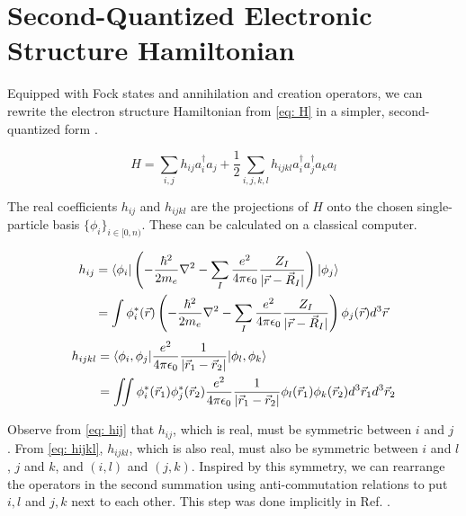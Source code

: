 \section{Second-Quantized Electronic Structure Hamiltonian}

Equipped with Fock states and annihilation and creation operators, we can rewrite the electron structure Hamiltonian from \eqref{eq: H} in a simpler, second-quantized form \cite{QCC}.

\begin{equation}
    H = \sum_{i, j} h_{ij}a^\dag_ia_j + \frac{1}{2}\sum_{i,j,k,l} h_{ijkl}a^\dag_ia^\dag_ja_ka_l
\end{equation}

The real coefficients $h_{ij}$ and $h_{ijkl}$ are the projections of $H$ onto the chosen single-particle basis $\{\phi_i\}_{i \in [0, n)}$. These can be calculated on a classical computer.

\begin{equation}
    \begin{split}
        h_{ij} &= \braket{\phi_i | \left(-\frac{\hbar^2}{2m_e}\nabla^2 - \sum_I \frac{e^2}{4\pi\epsilon_0}\frac{Z_I}{|\vec{r} - \vec{R}_I|}\right) | \phi_j} \\
        &= \int \phi^*_i(\vec{r})\left(-\frac{\hbar^2}{2m_e}\nabla^2 - \sum_I \frac{e^2}{4\pi\epsilon_0}\frac{Z_I}{|\vec{r} - \vec{R}_I|}\right)\phi_j(\vec{r}) d^3\vec{r}
    \end{split}
    \label{eq: hij}
\end{equation}
\begin{equation}
    \begin{split}
        h_{ijkl} &= \braket{\phi_i, \phi_j | \frac{e^2}{4\pi\epsilon_0}\frac{1}{|\vec{r}_1 - \vec{r}_2|} | \phi_l, \phi_k} \\
        &= \iint \phi^*_i(\vec{r}_1)\phi^*_j(\vec{r}_2)\frac{e^2}{4\pi\epsilon_0}\frac{1}{|\vec{r}_1 - \vec{r}_2|}\phi_l(\vec{r}_1)\phi_k(\vec{r}_2) d^3\vec{r}_1d^3\vec{r}_2
    \end{split}
    \label{eq: hijkl}
\end{equation}

Observe from \eqref{eq: hij} that $h_{ij}$, which is real, must be symmetric between $i$ and $j$ \cite{DF}. From \eqref{eq: hijkl}, $h_{ijkl}$, which is also real, must also be symmetric between $i$ and $l$, $j$ and $k$, and $(i, l)$ and $(j, k)$. Inspired by this symmetry, we can rearrange the operators in the second summation using anti-commutation relations to put $i, l$ and $j, k$ next to each other. This step was done implicitly in Ref. \cite{DF}.

